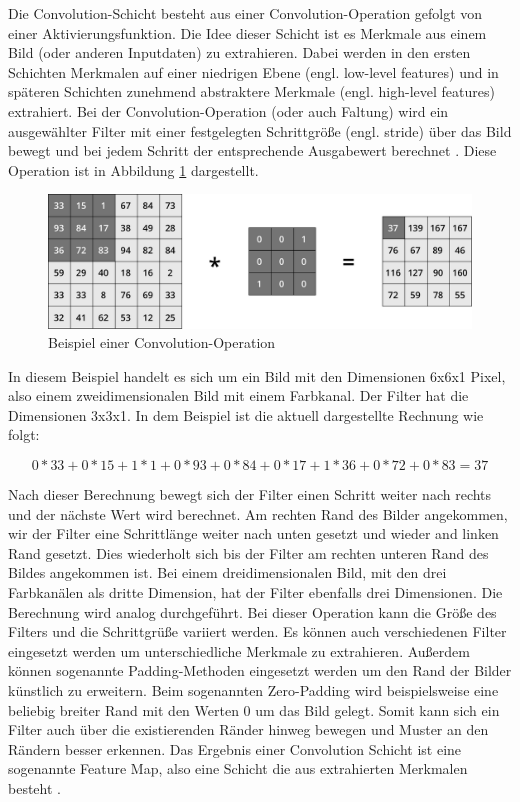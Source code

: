 Die Convolution-Schicht besteht aus einer Convolution-Operation gefolgt von einer Aktivierungsfunktion. Die Idee dieser Schicht ist es Merkmale aus einem Bild (oder anderen Inputdaten) zu extrahieren. Dabei werden in den ersten Schichten Merkmalen auf einer niedrigen Ebene (engl. low-level features) und in späteren Schichten zunehmend abstraktere Merkmale (engl. high-level features) extrahiert. Bei der Convolution-Operation (oder auch Faltung) wird ein ausgewählter Filter mit einer festgelegten Schrittgröße (engl. stride) über das Bild bewegt und bei jedem Schritt der entsprechende Ausgabewert berechnet \cite{lecun1998cnn}. Diese Operation ist in Abbildung \ref{fig_conv_operation} dargestellt.

\begin{figure}[h]
\centering
\includegraphics[scale=0.4]{images/conv_operation.pdf}
\caption{Beispiel einer Convolution-Operation}
\label{fig_conv_operation}
\end{figure}

In diesem Beispiel handelt es sich um ein Bild mit den Dimensionen 6x6x1 Pixel, also einem zweidimensionalen Bild mit einem Farbkanal. Der Filter hat die Dimensionen 3x3x1. In dem Beispiel ist die aktuell dargestellte Rechnung wie folgt:

\begin{equation*}
0*33+0*15+1*1+0*93+0*84+0*17+1*36+0*72+0*83=37
\end{equation*}

Nach dieser Berechnung bewegt sich der Filter einen Schritt weiter nach rechts und der nächste Wert wird berechnet. Am rechten Rand des Bilder angekommen, wir der Filter eine Schrittlänge weiter nach unten gesetzt und wieder and linken Rand gesetzt. Dies wiederholt sich bis der Filter am rechten unteren Rand des Bildes angekommen ist. Bei einem dreidimensionalen Bild, mit den drei Farbkanälen als dritte Dimension, hat der Filter ebenfalls drei Dimensionen. Die Berechnung wird analog durchgeführt. Bei dieser Operation kann die Größe des Filters und die Schrittgrüße variiert werden. Es können auch verschiedenen Filter eingesetzt werden um unterschiedliche Merkmale zu extrahieren. Außerdem können sogenannte Padding-Methoden eingesetzt werden um den Rand der Bilder künstlich zu erweitern. Beim sogenannten Zero-Padding wird beispielsweise eine beliebig breiter Rand mit den Werten 0 um das Bild gelegt. Somit kann sich ein Filter auch über die existierenden Ränder hinweg bewegen und Muster an den Rändern besser erkennen. Das Ergebnis einer Convolution Schicht ist eine sogenannte Feature Map, also eine Schicht die aus extrahierten Merkmalen besteht \cite{lecun1997convolutional}.


